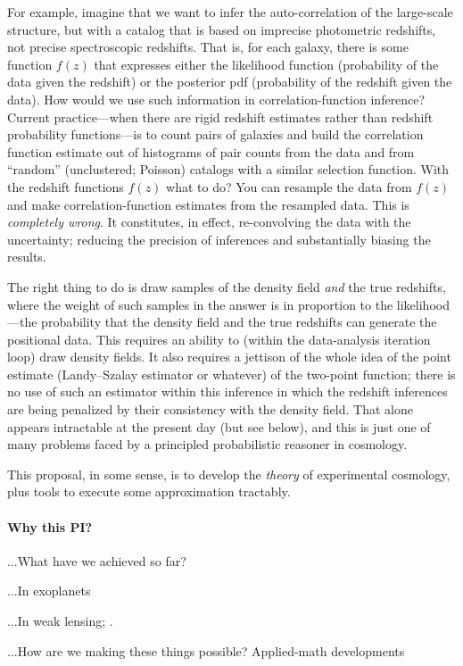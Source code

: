 \documentclass[12pt]{article}
\begin{document}
For example, imagine that we want to infer the auto-correlation of the
large-scale structure, but with a catalog that is based on imprecise
photometric redshifts, not precise spectroscopic redshifts.
That is, for each galaxy, there is some function $f(z)$ that expresses
either the likelihood function (probability of the data given the
redshift) or the posterior pdf (probability of the redshift given the
data).
How would we use such information in correlation-function inference?
Current practice---when there are rigid redshift estimates rather than
redshift probability functions---is to count pairs of galaxies and
build the correlation function estimate out of histograms of pair
counts from the data and from ``random'' (unclustered; Poisson)
catalogs with a similar selection function.
With the redshift functions $f(z)$ what to do?
You can resample the data from $f(z)$ and make correlation-function
estimates from the resampled data.
This is \emph{completely wrong}.
It constitutes, in effect, re-convolving the data with the
uncertainty; reducing the precision of inferences and substantially
biasing the results.

The right thing to do is draw samples of the density field \emph{and}
the true redshifts, where the weight of such samples in the answer is
in proportion to the likelihood---the probability that the density
field and the true redshifts can generate the positional data.
This requires an ability to (within the data-analysis iteration loop)
draw density fields.
It also requires a jettison of the whole idea of the point estimate
(Landy--Szalay estimator or whatever) of the two-point function; there
is no use of such an estimator within this inference in which the
redshift inferences are being penalized by their consistency with the
density field.
That alone appears intractable at the present day (but see below), and
this is just one of many problems faced by a principled probabilistic
reasoner in cosmology.

This proposal, in some sense, is to develop the \emph{theory} of
experimental cosmology, plus tools to execute some approximation
tractably.

\paragraph{Why this PI?}
...What have we achieved so far?

...In exoplanets

...In weak lensing; \thetractor.

...How are we making these things possible?  Applied-math developments
\end{document}
